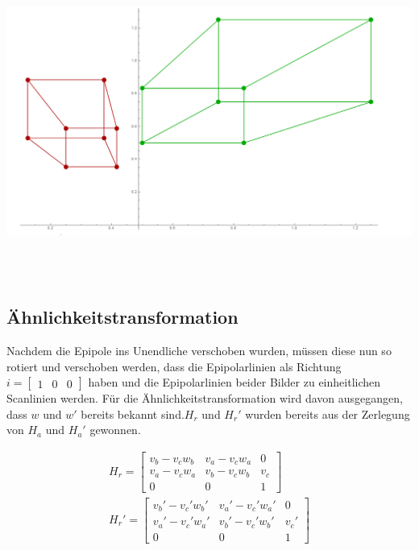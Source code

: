 \begin{minipage}{\linewidth}
	\centering
	\includegraphics[width=1.\linewidth]{images/Rectification_Hp_same_Solutions.png}
\end{minipage}\\ \\

\subsection{Ähnlichkeitstransformation}

Nachdem die Epipole ins Unendliche verschoben wurden, müssen diese nun so rotiert und verschoben werden, dass die Epipolarlinien als Richtung $i = \begin{bmatrix}1&0&0\end{bmatrix}$ haben und die Epipolarlinien beider Bilder zu einheitlichen Scanlinien werden. Für die Ähnlichkeitstransformation wird davon ausgegangen, dass $w$ und $w'$ bereits bekannt sind.$H_r$ und $H_r'$ wurden bereits aus der Zerlegung von $H_a$ und $H_a'$ gewonnen.

\begin{gather}
		H_r = 
	\begin{bmatrix}
	v_b-v_cw_b&	v_a-v_cw_a&0\\
	v_a-v_cw_a&v_b-v_cw_b&v_c\\
	0&0&1
	\end{bmatrix}\\
		H_r' = 
	\begin{bmatrix}
	v_b'-v_c'w_b'&	v_a'-v_c'w_a'&0\\
	v_a'-v_c'w_a'&v_b'-v_c'w_b'&v_c'\\
	0&0&1
	\end{bmatrix}\\
\end{gather}

